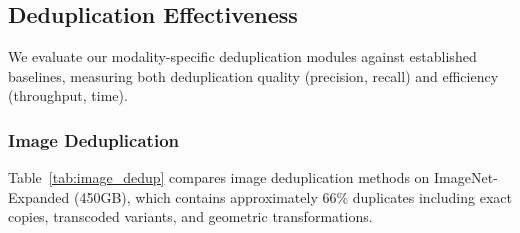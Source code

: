 \documentclass[sigconf, nonacm]{acmart}
\renewcommand{\arraystretch}{1.15}
\begin{document}
\subsection{Deduplication Effectiveness}

We evaluate our modality-specific deduplication modules against established baselines, measuring both deduplication quality (precision, recall) and efficiency (throughput, time).

\subsubsection{Image Deduplication}
Table~\ref{tab:image_dedup} compares image deduplication methods on ImageNet-Expanded (450GB), which contains approximately 66\% duplicates including exact copies, transcoded variants, and geometric transformations.

\begin{table}[t]
\caption{Image deduplication performance comparison.}
\label{tab:image_dedup}
\centering
\scriptsize
\setlength{\tabcolsep}{3pt}
\renewcommand{\arraystretch}{1.10}
\end{table}
\end{document}
